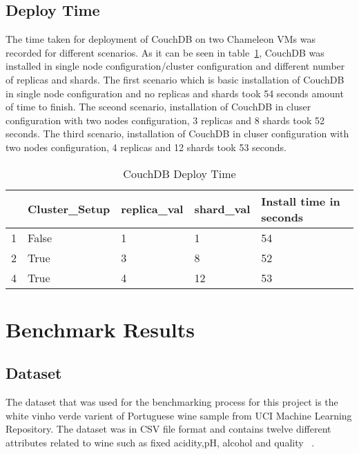 \subsection{Deploy Time}
The time taken for deployment of CouchDB on two Chameleon VMs was recorded for different
scenarios. As it can be seen in table~\ref{t:CouchDB-DeployTime},
CouchDB was installed in single node configuration/cluster configuration and different
number of replicas and shards. The first scenario which is basic installation of CouchDB
in single node configuration and no replicas and shards took 54 seconds
amount of time to finish. The sceond scenario, installation of CouchDB
in cluser configuration with two nodes configuration, 3 replicas and
8 shards took 52 seconds. The third scenario, installation of CouchDB
in cluser configuration with two nodes configuration, 4 replicas and
12 shards took 53 seconds. 

\begin{table}[]
\centering
\caption{CouchDB Deploy Time}
\label{t:CouchDB-DeployTime}
\begin{tabular}{|l|l|l|l|l|}
\hline
  & \textbf{Cluster\_Setup} & \textbf{replica\_val} & \textbf{shard\_val} & \textbf{Install time in seconds} \\ \hline
1 & False                   & 1                     & 1                   & 54                               \\ \hline
2 & True                    & 3                     & 8                   & 52                               \\ \hline
4 & True                    & 4                     & 12                  & 53                               \\ \hline
\end{tabular}
\end{table}

\section{Benchmark Results}
\subsection{Dataset}
The dataset that was used for the benchmarking process for this
project is the white vinho verde varient of Portuguese wine sample
from UCI Machine Learning Repository. The dataset was in CSV file
format and contains twelve different attributes related to wine such
as fixed acidity,pH, alcohol and quality ~\cite{www-WineQuality}. 

